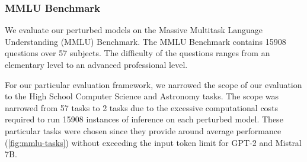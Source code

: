 \subsubsection{MMLU Benchmark}
We evaluate our perturbed models on the Massive Multitask Language Understanding (MMLU) Benchmark. The MMLU Benchmark contains 15908 questions over 57 subjects. The difficulty of the questions ranges from an elementary level to an advanced professional level\cite{hendrycks2021measuringmassivemultitasklanguage}. 

For our particular evaluation framework, we narrowed the scope of our evaluation to the High School Computer Science and Astronomy tasks. The scope was narrowed from 57 tasks to 2 tasks due to the excessive computational costs required to run 15908 instances of inference on each perturbed model. These particular tasks were chosen since they provide around average performance (\ref{fig:mmlu-tasks}) without exceeding the input token limit for GPT-2 and Mistral 7B.
